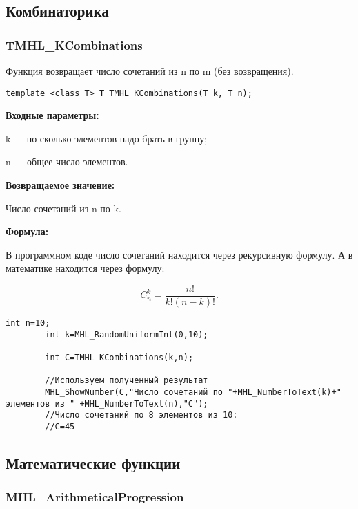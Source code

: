 \documentclass[a4paper,12pt]{article}
\begin{document}
\subsection{Комбинаторика}

\subsubsection{TMHL\_KCombinations}\label{TMHL_KCombinations}

Функция возвращает число сочетаний из n по m (без возвращения).


\begin{lstlisting}[label=code_syntax_TMHL_KCombinations,caption=Синтаксис]
template <class T> T TMHL_KCombinations(T k, T n);
\end{lstlisting}

\textbf{Входные параметры:}  
 
 k --- по сколько элементов надо брать в группу;
 
 n --- общее число элементов.

\textbf{Возвращаемое значение:}

 Число сочетаний из n по k.
 
 \textbf{Формула:}
 
 В программном коде число сочетаний находится через рекурсивную формулу. А в математике находится через формулу:
 
 \begin{equation*}
C_n^k=\dfrac{n!}{k!\left( n-k\right)! }.
\end{equation*}


\begin{lstlisting}[label=code_use_TMHL_KCombinations,caption=Пример использования]
        int n=10;
        int k=MHL_RandomUniformInt(0,10);

        int C=TMHL_KCombinations(k,n);

        //Используем полученный результат
        MHL_ShowNumber(C,"Число сочетаний по "+MHL_NumberToText(k)+" элементов из " +MHL_NumberToText(n),"C");
        //Число сочетаний по 8 элементов из 10:
        //C=45
\end{lstlisting}

\subsection{Математические функции}

\subsubsection{MHL\_ArithmeticalProgression}\label{MHL_ArithmeticalProgression}
\end{document}

